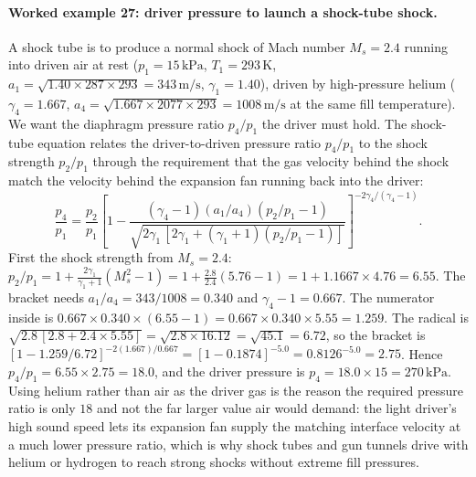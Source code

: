 \paragraph{Worked example 27: driver pressure to launch a shock-tube
shock.} A shock tube is to produce a normal shock of Mach number
$M_s = 2.4$ running into driven air at rest
($p_1 = 15\,\text{kPa}$, $T_1 = 293\,\si{\kelvin}$,
$a_1 = \sqrt{1.40\times 287\times 293} = 343\,\si{\meter\per\second}$,
$\gamma_1 = 1.40$), driven by high-pressure helium
($\gamma_4 = 1.667$, $a_4 = \sqrt{1.667\times 2077\times 293} =
1008\,\si{\meter\per\second}$ at the same fill temperature). We want the
diaphragm pressure ratio $p_4/p_1$ the driver must hold. The shock-tube
equation relates the driver-to-driven pressure ratio $p_4/p_1$ to the
shock strength $p_2/p_1$ through the requirement that the gas velocity
behind the shock match the velocity behind the expansion fan running
back into the driver:
\[
\frac{p_4}{p_1} = \frac{p_2}{p_1}\left[1 - \frac{(\gamma_4 - 1)(a_1/
a_4)(p_2/p_1 - 1)}{\sqrt{2\gamma_1\,[2\gamma_1 + (\gamma_1 + 1)
(p_2/p_1 - 1)]}}\right]^{-2\gamma_4/(\gamma_4 - 1)}.
\]
First the shock strength from $M_s = 2.4$:
$p_2/p_1 = 1 + \frac{2\gamma_1}{\gamma_1 + 1}(M_s^2 - 1) =
1 + \frac{2.8}{2.4}(5.76 - 1) = 1 + 1.1667\times 4.76 = 6.55$. The
bracket needs $a_1/a_4 = 343/1008 = 0.340$ and $\gamma_4 - 1 = 0.667$.
The numerator inside is $0.667\times 0.340\times(6.55 - 1) =
0.667\times 0.340\times 5.55 = 1.259$. The radical is
$\sqrt{2.8\,[2.8 + 2.4\times 5.55]} = \sqrt{2.8\times 16.12} =
\sqrt{45.1} = 6.72$, so the bracket is $[1 - 1.259/6.72]^{-2(1.667)/
0.667} = [1 - 0.1874]^{-5.0} = 0.8126^{-5.0} = 2.75$. Hence
$p_4/p_1 = 6.55\times 2.75 = 18.0$, and the driver pressure is
$p_4 = 18.0\times 15 = 270\,\text{kPa}$. Using helium rather than air as
the driver gas is the reason the required pressure ratio is only $18$
and not the far larger value air would demand: the light driver's high
sound speed lets its expansion fan supply the matching interface
velocity at a much lower pressure ratio, which is why shock tubes and
gun tunnels drive with helium or hydrogen to reach strong shocks without
extreme fill pressures.

